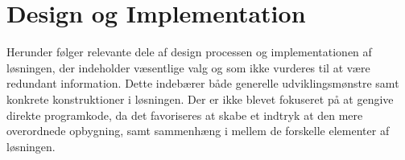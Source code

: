 \chapter{Design og Implementation}

Herunder følger relevante dele af design processen og implementationen af løsningen, der indeholder væsentlige valg og som ikke vurderes til at være redundant information. Dette indebærer både generelle udviklingsmønstre samt konkrete konstruktioner i løsningen. Der er ikke blevet fokuseret på at gengive direkte programkode, da det favoriseres at skabe et indtryk at den mere overordnede opbygning, samt sammenhæng i mellem de forskelle elementer af løsningen.





